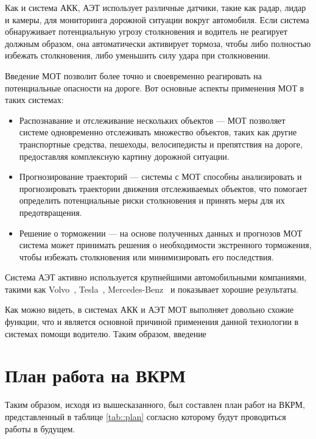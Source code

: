 Как и система АКК, АЭТ использует различные датчики, такие как радар, лидар и камеры, для мониторинга дорожной ситуации вокруг автомобиля. Если система обнаруживает потенциальную угрозу столкновения и водитель не реагирует должным образом, она автоматически активирует тормоза, чтобы либо полностью избежать столкновения, либо уменьшить силу удара при столкновении.

Введение МОТ позволит более точно и своевременно реагировать на потенциальные опасности на дороге. Вот основные аспекты применения МОТ в таких системах:

\begin{itemize}

	\item	Распознавание и отслеживание нескольких объектов --- МОТ позволяет системе одновременно отслеживать множество объектов, таких как другие транспортные средства, пешеходы, велосипедисты и препятствия на дороге, предоставляя комплексную картину дорожной ситуации.
	
	\item	Прогнозирование траекторий --- системы с МОТ способны анализировать и прогнозировать траектории движения отслеживаемых объектов, что помогает определить потенциальные риски столкновения и принять меры для их предотвращения.
	
	\item	Решение о торможении --- на основе полученных данных и прогнозов МОТ система может принимать решения о необходимости экстренного торможения, чтобы избежать столкновения или минимизировать его последствия.
	
\end{itemize}

Система АЭТ активно используется крупнейшими автомобильными компаниями, такими как Volvo~\cite{Volvo2009}, Tesla~\cite{Tesla2023}, Mercedes-Benz~\cite{MercedesBenz2021} и показывает хорошие результаты.

Как можно видеть, в системах АКК и АЭТ МОТ выполняет довольно схожие функции, что и является основной причиной применения данной технологии в системах помощи водителю. Таким образом, введение

\chapter{План работа на ВКРМ}

Таким образом, исходя из вышесказанного, был составлен план работ на ВКРМ, представленный в таблице \ref{tab::plan} согласно которому будут проводиться работы в будущем. 


